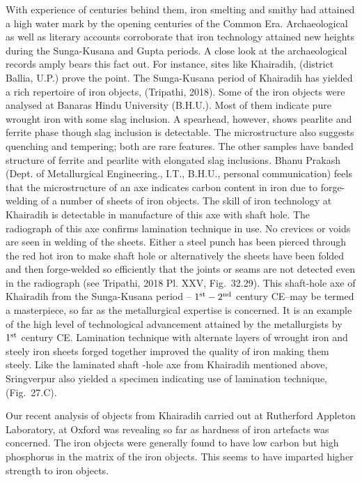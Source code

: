 With experience of centuries behind them, iron smelting and smithy had attained a high water mark by the opening centuries of the Common Era. Archaeological as well as literary accounts corroborate that iron technology attained new heights during the Sunga-Kusana and Gupta periods. A close look at the archaeological records amply bears this fact out. For instance, sites like Khairadih, (district Ballia, U.P.) prove the point. The Sunga-Kusana period of Khairadih has yielded a rich repertoire of iron objects, (Tripathi, 2018). Some of the iron objects were analysed at Banaras Hindu University (B.H.U.). Most of them indicate pure wrought iron with some slag inclusion. A spearhead, however, shows pearlite and ferrite phase though slag inclusion is detectable. The microstructure also suggests quenching and tempering; both are rare features. The other samples have banded structure of ferrite and pearlite with elongated slag inclusions. Bhanu Prakash (Dept. of Metallurgical Engineering., I.T., B.H.U., personal communication) feels that the microstructure of an axe indicates carbon content in iron due to forge-welding of a number of sheets of iron objects. The skill of iron technology at Khairadih is detectable in manufacture of this axe with shaft hole. The radiograph of this axe confirms lamination technique in use. No crevices or voids are seen in welding of the sheets. Either a steel punch has been pierced through the red hot iron to make shaft hole or alternatively the sheets have been folded and then forge-welded so efficiently that the joints or seams are not detected even in the radiograph (see Tripathi, 2018 Pl. XXV, Fig.~32.29). This shaft-hole axe of Khairadih from the Sunga-Kusana period – $1^{\rm st}  -2^{\rm nd}$ century CE–may be termed a masterpiece, so far as the metallurgical expertise is concerned. It is an example of the high level of technological advancement attained by the metallurgists by $1^{\rm st}$ century CE. Lamination technique with alternate layers of wrought iron and steely iron sheets forged together improved the quality of iron making them steely. Like the laminated shaft -hole axe from Khairadih mentioned above, Sringverpur also yielded a specimen indicating use of lamination technique, (Fig.~27.C).

Our recent analysis of objects from Khairadih carried out at Rutherford Appleton Laboratory, at Oxford was revealing so far as hardness of iron artefacts was concerned. The iron objects were generally found to have low carbon but high phosphorus in the matrix of the iron objects. This seems to have imparted higher strength to iron objects.  

